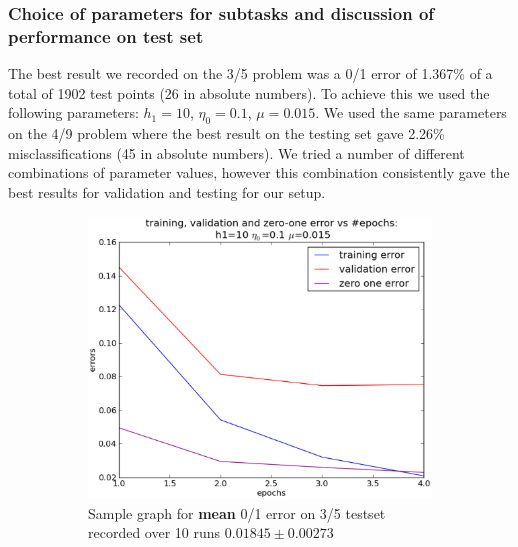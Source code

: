 	\subsubsection{Choice of parameters for subtasks and discussion of performance on test set}
	The best result we recorded on the 3/5 problem was a 0/1 error of 1.367\% of a total of 1902 test points (26 in absolute numbers). To achieve this we used the following parameters: $h_1=10$, $\eta _0=0.1$, $\mu =0.015$. We used the same parameters on the 4/9 problem where the best result on the testing set gave 2.26\% misclassifications (45 in absolute numbers). We tried a number of different combinations of parameter values, however this combination consistently gave the best results for validation and testing for our setup.  
	\begin{figure}[!ht]
	\centering
	\begin{subfigure}[b]{.45\textwidth}
	\centering
	\includegraphics[width=\textwidth]{mlp/plots/3_5/sample.eps}
	\caption{Sample graph for \textbf{mean} 0/1 error on 3/5 testset recorded over 10 runs $0.01845\pm 0.00273$}
	\label{subfig:result3}
	\end{subfigure}
	\quad
	\begin{subfigure}[b]{.45\textwidth}
	\centering

\end{subfigure}
\end{figure}
